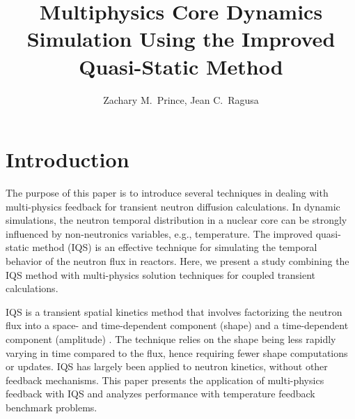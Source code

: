 \documentclass{anstrans}
\title{Multiphysics Core Dynamics Simulation Using the Improved Quasi-Static Method}
\author{Zachary M.~Prince, Jean C.~Ragusa}
\institute{Department of Nuclear Engineering, Texas A\&M University, College Station, TX}
\begin{document}
\vspace*{-42pt}
\begin{strip}
\vspace*{14pt}
\end{strip}


\section{Introduction}

The purpose of this paper is to introduce several techniques in dealing with multi-physics feedback for transient neutron diffusion calculations.  In dynamic simulations, the neutron temporal distribution in a nuclear core can be strongly influenced by non-neutronics variables, e.g., temperature. The improved quasi-static method (IQS) is an effective technique for simulating the temporal behavior of the neutron flux in reactors. Here, we present a study combining the IQS method with multi-physics solution techniques for coupled transient calculations.

IQS is a transient spatial kinetics method that involves factorizing the neutron flux into a space- and time-dependent component (shape) and a time-dependent component (amplitude) \cite{Ott_1966,Dulla2008}. The technique relies on the shape being less rapidly varying in time compared to the flux, hence requiring fewer shape computations or updates. IQS has largely been applied to neutron kinetics, without other feedback mechanisms. This paper presents the application of multi-physics feedback with IQS and analyzes performance with temperature feedback benchmark problems.
\end{document}
